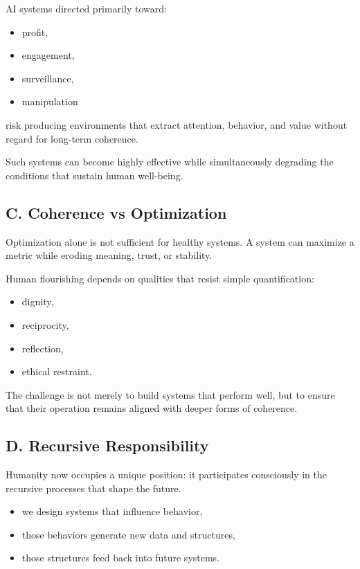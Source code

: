 \documentclass[12pt]{article}
\begin{document}
AI systems directed primarily toward:
\begin{itemize}
    \item profit,
    \item engagement,
    \item surveillance,
    \item manipulation
\end{itemize}

risk producing environments that extract attention, behavior, and value without regard for long-term coherence.

Such systems can become highly effective while simultaneously degrading the conditions that sustain human well-being.

\subsection*{C. Coherence vs Optimization}

Optimization alone is not sufficient for healthy systems. A system can maximize a metric while eroding meaning, trust, or stability.

Human flourishing depends on qualities that resist simple quantification:
\begin{itemize}
    \item dignity,
    \item reciprocity,
    \item reflection,
    \item ethical restraint.
\end{itemize}

The challenge is not merely to build systems that perform well, but to ensure that their operation remains aligned with deeper forms of coherence.

\subsection*{D. Recursive Responsibility}

Humanity now occupies a unique position: it participates consciously in the recursive processes that shape the future.

\begin{itemize}
    \item we design systems that influence behavior,
    \item those behaviors generate new data and structures,
    \item those structures feed back into future systems.
\end{itemize}
\end{document}
